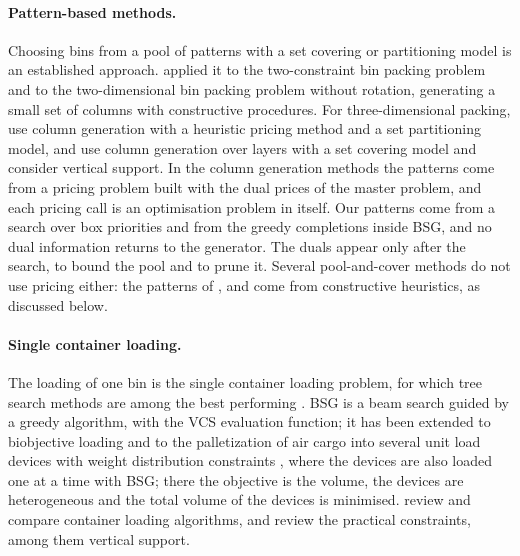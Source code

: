 \paragraph{Pattern-based methods.}
Choosing bins from a pool of patterns with a set covering or partitioning model is an established
approach. \citet{Monaci2006} applied it to the two-constraint bin packing problem and to the
two-dimensional bin packing problem without rotation, generating a small set of columns with
constructive procedures. For three-dimensional packing, \citet{Mahvash2018} use column generation
with a heuristic pricing method and a set partitioning model, and \citet{Elhedhli2019} use column
generation over layers with a set covering model and consider vertical support. In the column
generation methods the patterns come from a pricing problem built with the dual prices of the master
problem, and each pricing call is an optimisation problem in itself. Our patterns come from a search
over box priorities and from the greedy completions inside BSG, and no dual information returns to the
generator. The duals appear only after the search, to bound the pool and to prune it. Several pool-and-cover
methods do not use pricing either: the patterns of \citet{Monaci2006}, \citet{Eley2003} and \citet{Che2011} come from
constructive heuristics, as discussed below.

\paragraph{Single container loading.}
The loading of one bin is the single container loading problem, for which tree search methods are
among the best performing \citep{Fanslau2010,Zhu2012,Araya2014,Araya2017,Guesser2026}. BSG
\citep{Araya2014,Araya2017} is a beam search guided by a greedy algorithm, with the VCS evaluation
function; it has been extended to biobjective loading \citep{Araya2020} and to the palletization of air cargo
into several unit load devices with weight distribution constraints \citep{ArayaULD}, where the devices are
also loaded one at a time with BSG; there the objective is the volume, the devices are heterogeneous and the
total volume of the devices is minimised. \citet{Zhao2016} review and compare
container loading algorithms, and \citet{Bortfeldt2013} review the practical constraints, among them
vertical support.

